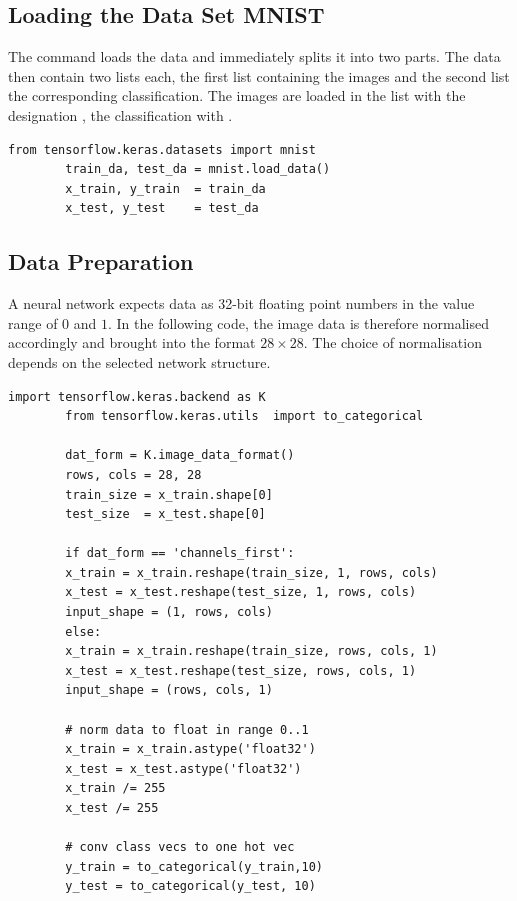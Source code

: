 \subsection{Loading the Data Set MNIST}

The command  loads the data and immediately splits it into two parts. The data then contain two lists each, the first list containing the images and the second list the corresponding classification. The images are loaded in the list with the designation , the classification with .

\medskip


\begin{code}
    \begin{lstlisting}[numbers=none]
        from tensorflow.keras.datasets import mnist
        train_da, test_da = mnist.load_data()
        x_train, y_train  = train_da
        x_test, y_test    = test_da
    \end{lstlisting}
    
    \caption{Loading the data set MNIST}
\end{code}


\subsection{Data Preparation}

A neural network expects data as 32-bit floating point numbers in the value range of $0$ and $1$. In the following code, the image data is therefore normalised accordingly and brought into the format $28 \times 28$. The choice of normalisation depends on the selected network structure.




\begin{code}
    \begin{lstlisting}[numbers=none]
        import tensorflow.keras.backend as K
        from tensorflow.keras.utils  import to_categorical
        
        dat_form = K.image_data_format()
        rows, cols = 28, 28
        train_size = x_train.shape[0]
        test_size  = x_test.shape[0]
        
        if dat_form == 'channels_first':
        x_train = x_train.reshape(train_size, 1, rows, cols)
        x_test = x_test.reshape(test_size, 1, rows, cols)
        input_shape = (1, rows, cols)
        else:
        x_train = x_train.reshape(train_size, rows, cols, 1)
        x_test = x_test.reshape(test_size, rows, cols, 1)
        input_shape = (rows, cols, 1)
        
        # norm data to float in range 0..1
        x_train = x_train.astype('float32')
        x_test = x_test.astype('float32')
        x_train /= 255
        x_test /= 255
        
        # conv class vecs to one hot vec
        y_train = to_categorical(y_train,10)
        y_test = to_categorical(y_test, 10)
    \end{lstlisting}
    
    \caption{Normalisation of the data set MNIST}
\end{code}


